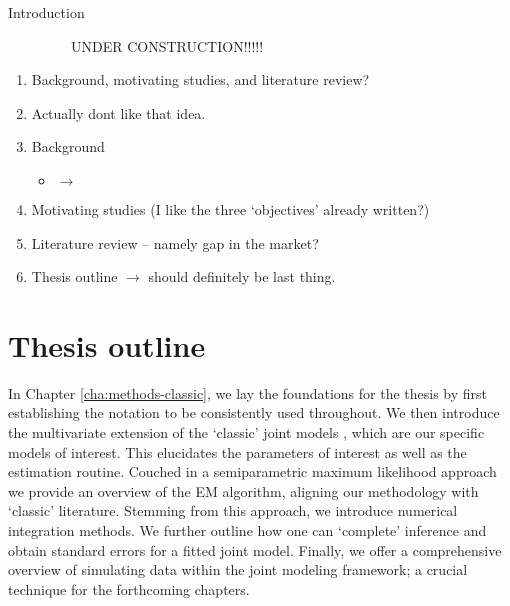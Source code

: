 \begin{chapter}{\label{cha:intro}Introduction}

  \begin{center}
      \vfill
      \begin{redbox}
          \ \ \ \ \ \ \ \ \ \huge UNDER CONSTRUCTION!!!!!
          \normalsize
          \begin{enumerate}
              \item Background, motivating studies, and literature review?
              \item Actually dont like that idea.
              \item Background
              \begin{itemize}
                  \item $\rightarrow$ 
              \end{itemize}
              \item Motivating studies (I like the three `objectives' already written?)
              \item Literature review -- namely gap in the market?
              \item Thesis outline $\rightarrow$ should definitely be last thing.
          \end{enumerate}
      \end{redbox}
      \vfill
  \end{center}
  \clearpage

  \section{Thesis outline}
  In Chapter \ref{cha:methods-classic}, we lay the foundations for the thesis by first establishing the notation to be consistently used throughout. We then introduce the multivariate extension of the `classic' joint models \citep{Wulfsohn97, Henderson2000}, which are our specific models of interest. This  elucidates the parameters of interest as well as the estimation routine. Couched in a semiparametric maximum likelihood approach we provide an overview of the EM algorithm, aligning our methodology with  `classic' literature. Stemming from this approach, we introduce numerical integration methods. We further outline how one can `complete' inference and obtain standard errors for a fitted joint model. Finally, we offer a comprehensive overview of simulating data within the joint modeling framework; a crucial technique for the forthcoming chapters.


\end{chapter}
